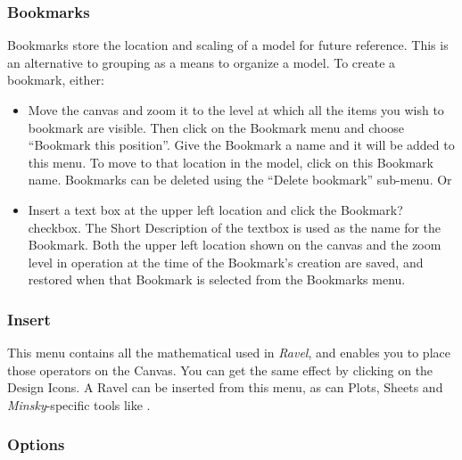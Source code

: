 \subsubsection{Bookmarks}

\label{Bookmarks} Bookmarks store the location and scaling of a model
for future reference. This is an alternative to grouping as a means
to organize a model. To create a bookmark, either:
\begin{itemize}
\item Move the canvas and zoom it to the level at which all the items you
wish to bookmark are visible. Then click on the Bookmark menu and
choose ``Bookmark this position''. Give the Bookmark a name and it
will be added to this menu. To move to that location in the model,
click on this Bookmark name. Bookmarks can be deleted using the ``Delete
bookmark'' sub-menu. Or
\item Insert a text box at the upper left location and click the Bookmark?
checkbox. The Short Description of the textbox is used as the name
for the Bookmark. Both the upper left location shown on the canvas
and the zoom level in operation at the time of the Bookmark's creation
are saved, and restored when that Bookmark is selected from the Bookmarks
menu.
\end{itemize}

\subsubsection{Insert}

\label{Insert}

This menu contains all the mathematical 
used in \emph{Ravel}, and enables you to place those operators on
the Canvas. You can get the same effect by clicking on the Design
Icons. A Ravel can be inserted from this menu, as can Plots, Sheets
and \emph{Minsky}-specific tools like .

\subsubsection{Options}

\label{Options}

